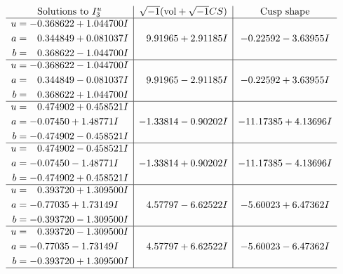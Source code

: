 \documentclass[1p]{elsarticle_modified}
\theoremstyle{definition}
\newcommand{\I}{\sqrt{-1}}
\begin{document}
$$\begin{array}{c|c|c}  
\text{Solutions to }I^u_{3}& \I (\text{vol} + \sqrt{-1}CS) & \text{Cusp shape}\\
 \hline 
\begin{aligned}
u &= -0.368622 + 1.044700 I \\
a &= \phantom{-}0.344849 + 0.081037 I \\
b &= \phantom{-}0.368622 - 1.044700 I\end{aligned}
 & \phantom{-}9.91965 + 2.91185 I & -0.22592 - 3.63955 I \\ \hline\begin{aligned}
u &= -0.368622 - 1.044700 I \\
a &= \phantom{-}0.344849 - 0.081037 I \\
b &= \phantom{-}0.368622 + 1.044700 I\end{aligned}
 & \phantom{-}9.91965 - 2.91185 I & -0.22592 + 3.63955 I \\ \hline\begin{aligned}
u &= \phantom{-}0.474902 + 0.458521 I \\
a &= -0.07450 + 1.48771 I \\
b &= -0.474902 - 0.458521 I\end{aligned}
 & -1.33814 - 0.90202 I & -11.17385 + 4.13696 I \\ \hline\begin{aligned}
u &= \phantom{-}0.474902 - 0.458521 I \\
a &= -0.07450 - 1.48771 I \\
b &= -0.474902 + 0.458521 I\end{aligned}
 & -1.33814 + 0.90202 I & -11.17385 - 4.13696 I \\ \hline\begin{aligned}
u &= \phantom{-}0.393720 + 1.309500 I \\
a &= -0.77035 + 1.73149 I \\
b &= -0.393720 - 1.309500 I\end{aligned}
 & \phantom{-}4.57797 - 6.62522 I & -5.60023 + 6.47362 I \\ \hline\begin{aligned}
u &= \phantom{-}0.393720 - 1.309500 I \\
a &= -0.77035 - 1.73149 I \\
b &= -0.393720 + 1.309500 I\end{aligned}
 & \phantom{-}4.57797 + 6.62522 I & -5.60023 - 6.47362 I\\
 \hline 
 \end{array}$$\newpage\newpage\renewcommand{\arraystretch}{1}
\end{document}
